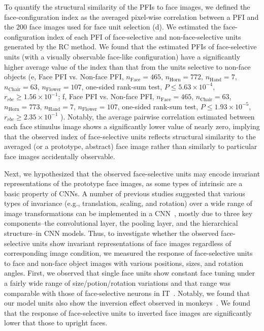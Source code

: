 \documentclass[final,3p,times,twocolumn]{elsarticle}
\begin{document}
To quantify the structural similarity of the PFIs to face images, we defined the face-configuration index as the averaged pixel-wise correlation between a PFI and the 200 face images used for face unit selection (d).
We estimated the face-configuration index of each PFI of face-selective and non-face-selective units generated by the RC method.
We found that the estimated PFIs of face-selective units (with a visually observable face-like configuration) have a significantly higher average value of the index than that from the units selective to non-face objects (e, 
Face PFI vs. Non-face PFI, 
$ n_\textrm{Face}    = 465 $,
$ n_\textrm{Horn}    = 772 $,
$ n_\textrm{Hand}    = 7   $,
$ n_\textrm{Chair}   = 63  $,
$ n_\textrm{Flower}  = 107 $,
one-sided rank-sum test,
$ P \leq 5.63 \times 10^{-4} $,
$ r_{rbc} \geq 1.56 \times 10^{-1} $;
f, Face PFI vs. Non-face PFI,
$ n_\textrm{Face}   = 465 $,
$ n_\textrm{Chair}  = 63  $,
$ n_\textrm{Horn}	= 773 $,
$ n_\textrm{Hand}	= 7	  $,
$ n_\textrm{Flower}	= 107 $,
one-sided rank-sum test, 
$ P \leq 1.93 \times 10^{-5} $,
$ r_{rbc} \geq 2.35 \times 10^{-1} $
).
Notably, the average pairwise correlation estimated between each face stimulus image shows a significantly lower value of nearly zero, 
implying that the observed index of face-selective units reflects structural similarity to the averaged (or a prototype, abstract) face image rather than similarly to particular face images accidentally observable.


Next, we hypothesized that the observed face-selective units may encode invariant representations of the prototype face images, as some types of intrinsic are a basic property of CNNs.
A number of previous studies suggested that various types of invariance (e.g., translation, scaling, and rotation) over a wide range of image transformations can be implemented in a CNN~\cite{lecun2004learning,kavukcuoglu2010learning,lecun2012learning,chidester2018rotation,srivastava2018effect}, mostly due to three key components--the convolutional layer, the pooling layer, and the hierarchical structure--in CNN models.
Thus, to investigate whether the observed face-selective units show invariant representations of face images regardless of corresponding image condition, 
we measured the response of face-selective units to face and non-face object images with various positions, sizes, and rotation angles.
First, we observed that single face units show constant face tuning under a fairly wide range of size/potion/rotation variations and that range was comparable with those of face-selective neurons in IT~\cite{zoccolan2007trade}.
Notably, we found that our model units also show the inversion effect observed in monkeys~\cite{tsao2006cortical,buiatti2019cortical,perrett1985visual}.
We found that the response of face-selective units to inverted face images are significantly lower that those to upright faces.
\end{document}
